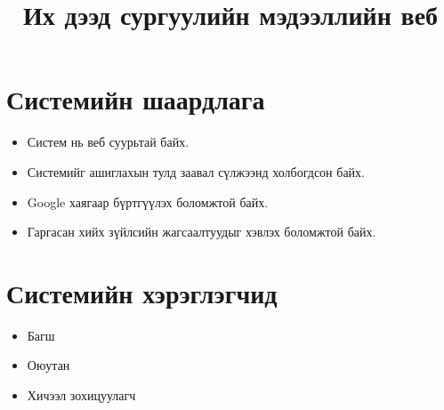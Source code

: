 \documentclass[12pt]{article}
\title{Их дээд сургуулийн мэдээллийн веб}
\begin{document}
	\maketitle
		\section{Системийн шаардлага}
		\begin{itemize}
			\item Систем нь веб суурьтай байх.
			\item Системийг ашиглахын тулд заавал сүлжээнд холбогдсон байх.
			\item Google хаягаар бүртгүүлэх боломжтой байх.
			\item Гаргасан хийх зүйлсийн жагсаалтуудыг хэвлэх боломжтой байх.
		 	
		\end{itemize}
	\section{Системийн хэрэглэгчид}
	\begin{itemize}
		\item Багш
		\item Оюутан
		\item Хичээл зохицуулагч
	\end{itemize}
\end{document}
